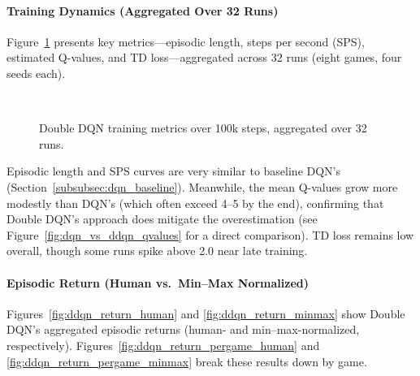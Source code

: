 \paragraph{Training Dynamics (Aggregated Over 32 Runs)}
Figure~\ref{fig:ddqn_subfigs} presents key metrics—episodic length, steps per second (SPS), estimated Q-values, and TD loss—aggregated across 32 runs (eight games, four seeds each). 

\begin{figure}
	\centering
	\quad
	\\[1em]
	\quad
	\caption{Double DQN training metrics over 100k steps, aggregated over 32 runs.}
	\label{fig:ddqn_subfigs}
\end{figure}

Episodic length and SPS curves are very similar to baseline DQN's (Section~\ref{subsubsec:dqn_baseline}). 
Meanwhile, the mean Q-values grow more modestly than DQN's (which often exceed 4--5 by the end), confirming 
that Double DQN's approach does mitigate the overestimation (see Figure~\vref{fig:dqn_vs_ddqn_qvalues} for a direct comparison).
TD loss remains low overall, though some runs spike above 2.0 near late training.

\paragraph{Episodic Return (Human vs.\ Min--Max Normalized)}
Figures~\vref{fig:ddqn_return_human} and \ref{fig:ddqn_return_minmax} show Double DQN's aggregated episodic returns (human- and min--max-normalized, respectively). 
Figures~\ref{fig:ddqn_return_pergame_human} and \ref{fig:ddqn_return_pergame_minmax} break these results down by game.


